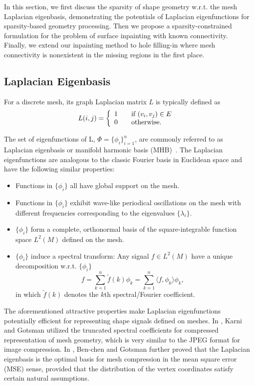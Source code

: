 In this section, we first discuss the sparsity of shape geometry w.r.t. the
mesh Laplacian eigenbasis, demonstrating the potentials of Laplacian
eigenfunctions for sparsity-based geometry processing. Then we propose a
sparsity-constrained formulation for the problem of surface inpainting with
known connectivity. Finally, we extend our inpainting method to hole
filling-in where mesh connectivity is nonexistent in the missing regions in
the first place.

\subsection{Laplacian Eigenbasis}

For a discrete mesh, its graph Laplacian matrix $L$ is typically
defined as
\begin{equation}
L(i,j) = \left\{
    \begin{array}{l l}
    1 & \quad \text{if $(v_i, v_j) \in E$} \\
    0 & \quad \text{otherwise.}
    \end{array}\right.
\end{equation}

The set of eigenfunctions of L, $\Phi = \{\phi_i\}_{i=1}^n$, are commonly
referred to as Laplacian eigenbasis or manifold harmonic basis
(MHB)~\cite{Vallet2008}. The Laplacian eigenfunctions are analogous to
the classic Fourier basis in Euclidean space and have the following similar
properties:
\begin{itemize}
\item Functions in $\{\phi_i\}$ all have global support on the mesh.
\item Functions in $\{\phi_i\}$ exhibit wave-like periodical
  oscillations on the mesh with different frequencies corresponding to
  the eigenvalues $\{\lambda_i\}$.
\item $\{\phi_i\}$ form a complete, orthonormal basis of the
  square-integrable function space $L^2(M)$ defined on the mesh.
\item $\{\phi_i\}$ induce a spectral transform: Any signal $f\in
  L^2(M)$ have a unique decomposition w.r.t. $\{\phi_i\}$
      $$f=\sum_{k=1}^n \tilde{f}(k) \phi_k = \sum_{k=1}^n \langle f,\phi_k \rangle \phi_k,$$
      in which $\tilde{f}(k)$ denotes the $k$th spectral/Fourier
      coefficient.
\end{itemize}

The aforementioned attractive properties make Laplacian eigenfunctions
potentially efficient for representing shape signals defined on
meshes. In \cite{Karni2000}, Karni and Gotsman utilized the truncated
spectral coefficients for compressed representation of mesh geometry, which
is very similar to the JPEG format for image compression.
In \cite{Ben-Chen2005}, Ben-chen and Gotsman further proved that the
Laplacian eigenbasis is the optimal basis for mesh compression in the
mean square error (MSE) sense, provided that the distribution of the
vertex coordinates satisfy certain natural assumptions.

